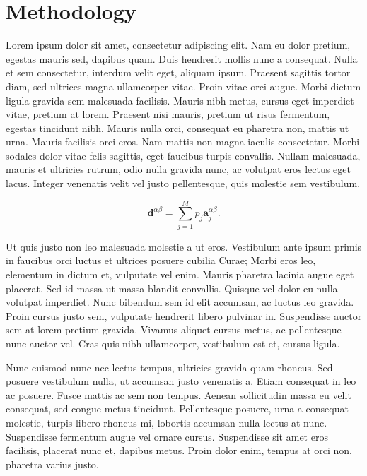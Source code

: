 \documentclass[manuscript]{geophysics}
\newcommand{\vect}[1]{\mathbf{#1}}
\begin{document}
\section{Methodology}

Lorem ipsum dolor sit amet, consectetur adipiscing elit. Nam eu dolor pretium,
egestas mauris sed, dapibus quam. Duis hendrerit mollis nunc a consequat. Nulla
et sem consectetur, interdum velit eget, aliquam ipsum. Praesent sagittis
tortor diam, sed ultrices magna ullamcorper vitae. Proin vitae orci augue.
Morbi dictum ligula gravida sem malesuada facilisis. Mauris nibh metus, cursus
eget imperdiet vitae, pretium at lorem. Praesent nisi mauris, pretium ut risus
fermentum, egestas tincidunt nibh. Mauris nulla orci, consequat eu pharetra
non, mattis ut urna. Mauris facilisis orci eros. Nam mattis non magna iaculis
consectetur. Morbi sodales dolor vitae felis sagittis, eget faucibus turpis
convallis. Nullam malesuada, mauris et ultricies rutrum, odio nulla gravida
nunc, ac volutpat eros lectus eget lacus. Integer venenatis velit vel justo
pellentesque, quis molestie sem vestibulum.

\begin{equation}
    \vect{d}^{\alpha\beta} = \sum\limits_{j=1}^{M} p_j \vect{a}_j^{\alpha\beta}.
    \label{eq:dalphabeta_sum}
\end{equation}

Ut quis justo non leo malesuada molestie a ut eros. Vestibulum ante ipsum
primis in faucibus orci luctus et ultrices posuere cubilia Curae; Morbi eros
leo, elementum in dictum et, vulputate vel enim. Mauris pharetra lacinia augue
eget placerat. Sed id massa ut massa blandit convallis. Quisque vel dolor eu
nulla volutpat imperdiet. Nunc bibendum sem id elit accumsan, ac luctus leo
gravida. Proin cursus justo sem, vulputate hendrerit libero pulvinar in.
Suspendisse auctor sem at lorem pretium gravida. Vivamus aliquet cursus metus,
ac pellentesque nunc auctor vel. Cras quis nibh ullamcorper, vestibulum est et,
cursus ligula.

Nunc euismod nunc nec lectus tempus, ultricies gravida quam rhoncus. Sed
posuere vestibulum nulla, ut accumsan justo venenatis a. Etiam consequat in leo
ac posuere. Fusce mattis ac sem non tempus. Aenean sollicitudin massa eu velit
consequat, sed congue metus tincidunt. Pellentesque posuere, urna a consequat
molestie, turpis libero rhoncus mi, lobortis accumsan nulla lectus at nunc.
Suspendisse fermentum augue vel ornare cursus. Suspendisse sit amet eros
facilisis, placerat nunc et, dapibus metus. Proin dolor enim, tempus at orci
non, pharetra varius justo.
\end{document}
